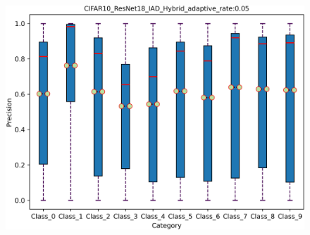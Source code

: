 \documentclass[fontset=macnew,UTF8]{article} %
\begin{document}
\begin{figure}[t]
{\begin{minipage}[b]{.3\linewidth}
			\includegraphics[scale=0.3]{./Backdoor_detect_result/target_class/IAD.png}
		\end{minipage}
	}
	

\end{figure}
\end{document}
